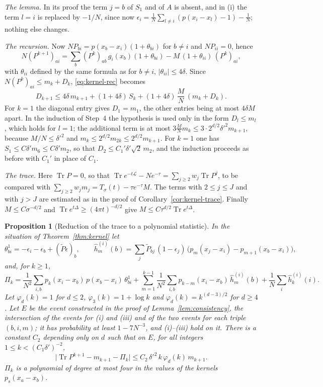 \documentclass[11pt,a4paper]{article}
\makeatletter
\theoremstyle{stmt}
\newtheorem{proposition}[theorem]{Proposition}
\theoremstyle{defn}
\theoremstyle{rmk}
\renewenvironment{proof}[1][\proofname]{\par\pushQED{\qed}\normalfont\topsep6\p@\@plus6\p@\relax
  \trivlist\item[\hskip\labelsep{\sffamily\itshape\small #1.}]\ignorespaces}{\popQED\endtrivlist\@endpefalse}
\numberwithin{equation}{section}
\DeclareMathOperator{\Tr}{Tr}
\newcommand{\Lc}{\mathcal{L}}
\makeatother
\begin{document}
{\begin{proof}
\emph{The lemma.} In its proof the term $j=b$ of $S_1$ and of $A$ is absent, and in (i) the term $l=i$ is replaced by $-1/N$, since now $\epsilon_i=\frac1N\sum_{l\ne i}(p(x_i-x_l)-1)-\frac1N$; nothing else changes.

\emph{The recursion.} Now $NP_{bi}=p(x_b-x_i)(1+\theta_{bi})$ for $b\ne i$ and $NP_{ii}=0$, hence
\[
N(P^{k+1})_{ai}=\sum_b(P^k)_{ab}\,g_i(x_b)(1+\theta_{bi})-M\,(1+\theta_{ii})\,(P^k)_{ai},
\]
with $\theta_{ii}$ defined by the same formula as for $b\ne i$, $|\theta_{ii}|\le4\delta$. Since $N(P^k)_{ai}\le m_k+D_k$, \eqref{eq:kernel-rec} becomes
\[
D_{k+1}\le4\delta\,m_{k+1}+(1+4\delta)\,S_k+(1+4\delta)\,\frac MN\,(m_k+D_k).
\]
For $k=1$ the diagonal entry gives $D_1=m_1$, the other entries being at most $4\delta M$ apart. In the induction of Step~4 the hypothesis is used only in the form $D_l\le m_l$, which holds for $l=1$; the additional term is at most $3\frac MNm_k\le3\cdot2^{d/2}\delta'^2m_{k+1}$, because $M/N\le\delta'^2$ and $m_k\le2^{d/2}m_{2k}\le2^{d/2}m_{k+1}$. For $k=1$ one has $S_1\le C\delta'm_6\le C\delta'm_2$, so that $D_2\le C_1'\delta'\sqrt2\,m_2$, and the induction proceeds as before with $C_1'$ in place of $C_1$.

\emph{The trace.} Here $\Tr P=0$, so that $\Tr e^{-t\Lc}-Ne^{-\tau}=\sum_{j\ge2}w_j\Tr P^j$, to be compared with $\sum_{j\ge2}w_jm_j=T_\sigma(t)-\tau e^{-\tau}M$. The terms with $2\le j\le J$ and with $j>J$ are estimated as in the proof of Corollary~\ref{cor:kernel-trace}. Finally $M\le C\sigma^{-d/2}$ and $\Tr e^{t\Delta}\ge(4\pi t)^{-d/2}$ give $M\le C\tau^{d/2}\Tr e^{t\Delta}$.
\end{proof}

\begin{proposition}[Reduction of the trace to a polynomial statistic]\label{prop:reduction}
In the situation of Theorem~\ref{thm:kernel} let
\[
\theta^1_{bi}=-\epsilon_i-\epsilon_b+(\tilde P\epsilon)_b,\qquad
\hat h^{(i)}_m(b)=\sum_j\tilde P_{bj}\,(1-\epsilon_j)\,\big(p_m(x_j-x_i)-p_{m+1}(x_b-x_i)\big),
\]
and, for $k\ge1$,
\[
\Pi_k=\frac1{N^2}\sum_{i,b}p_k(x_i-x_b)\,p(x_b-x_i)\,\theta^1_{bi}
+\sum_{m=1}^{k-1}\frac1{N^2}\sum_{i,b}p_{k-m}(x_i-x_b)\,\hat h^{(i)}_m(b)
+\frac1N\sum_i\hat h^{(i)}_k(i).
\]
Let $\varphi_d(k)=1$ for $d\le2$, $\varphi_3(k)=1+\log k$ and $\varphi_d(k)=k^{(d-3)/2}$ for $d\ge4$. Let $E$ be the event constructed in the proof of Lemma~\ref{lem:consistency}, the intersection of the events for (i) and (iii) and of the two events for each triple $(b,i,m)$; it has probability at least $1-7N^{-3}$, and (i)--(iii) hold on it. There is a constant $C_2$ depending only on $d$ such that on $E$, for all integers $1\le k<(C_1\delta')^{-2}$,
\[
\big|\Tr P^{k+1}-m_{k+1}-\Pi_k\big|\le C_2\,\delta'^2\,k\,\varphi_d(k)\,m_{k+1}.
\]
$\Pi_k$ is a polynomial of degree at most four in the values of the kernels $p_s(x_a-x_b)$.
\end{proposition}

}
\end{document}
